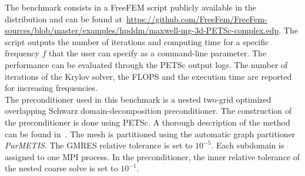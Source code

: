 The benchmark consists in a FreeFEM script publicly available in the distribution and can be found at~\url{https://github.com/FreeFem/FreeFem-sources/blob/master/examples/hpddm/maxwell-mg-3d-PETSc-complex.edp}. The script outputs the number of iterations and computing time for a specific frequency $f$ that the user can specify as a command-line parameter. The performance can be evaluated through the PETSc output logs. The number of iterations of the Krylov solver, the FLOPS and the execution time are reported for increasing frequencies.\\

The preconditioner used in this benchmark is a nested two-grid optimized overlapping Schwarz domain-decomposition preconditioner. The construction of the preconditioner is done using PETSc. A thorough description of the method can be found in~\cite{bonazzoli_domain_2019}. The mesh is partitioned using the automatic graph partitioner \textit{ParMETIS}. The GMRES relative tolerance is set to $10^{-5}$. Each subdomain is assigned to one MPI process. In the preconditioner, the inner relative tolerance of the nested coarse solve is set to $10^{-1}$.

